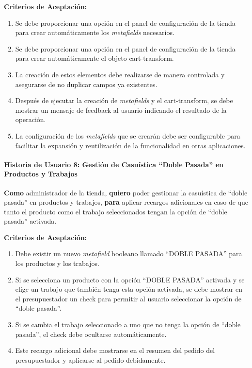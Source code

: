 \documentclass[11pt]{article}
\newcommand{\subsubsubsection}[1]{\paragraph{#1}}
\begin{document}
\vspace{0.5cm}
\textbf{Criterios de Aceptación:}
\begin{enumerate}[label=\arabic*.]
    \item Se debe proporcionar una opción en el panel de configuración de la tienda para crear automáticamente los \textit{metafields} necesarios.
    \item Se debe proporcionar una opción en el panel de configuración de la tienda para crear automáticamente el objeto cart-transform.
    \item La creación de estos elementos debe realizarse de manera controlada y asegurarse de no duplicar campos ya existentes.
    \item Después de ejecutar la creación de \textit{metafields} y el cart-transform, se debe mostrar un mensaje de feedback al usuario indicando el resultado de la operación.
    \item La configuración de los \textit{metafields} que se crearán debe ser configurable para facilitar la expansión y reutilización de la funcionalidad en otras aplicaciones.
\end{enumerate}


\subsubsubsection{Historia de Usuario 8: Gestión de Casuística ``Doble Pasada'' en Productos y Trabajos}\label{sec:historia8}

\textbf{Como} administrador de la tienda,
\textbf{quiero} poder gestionar la casuística de ``doble pasada'' en productos y trabajos,
\textbf{para} aplicar recargos adicionales en caso de que tanto el producto como el trabajo seleccionados tengan la opción de ``doble pasada'' activada.

\vspace{0.5cm}
\textbf{Criterios de Aceptación:}
\begin{enumerate}[label=\arabic*.]
    \item Debe existir un nuevo \textit{metafield} booleano llamado ``DOBLE PASADA'' para los productos y los trabajos.
    \item Si se selecciona un producto con la opción ``DOBLE PASADA'' activada y se elige un trabajo que también tenga esta opción activada, se debe mostrar en el presupuestador un check para permitir al usuario seleccionar la opción de ``doble pasada''.
    \item Si se cambia el trabajo seleccionado a uno que no tenga la opción de ``doble pasada'', el check debe ocultarse automáticamente.
    \item Este recargo adicional debe mostrarse en el resumen del pedido del presupuestador y aplicarse al pedido debidamente.
\end{enumerate}
\end{document}
